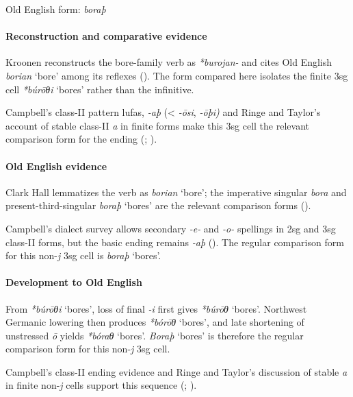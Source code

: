 \documentclass[
  british,
  a4paper,
]{article}
\providecommand{\Recon}[1]{\emph{*#1}}
\begin{document}
Old English form: \emph{boraþ}

\paragraph{Reconstruction and comparative
evidence}\label{reconstruction-and-comparative-evidence-126}

Kroonen reconstructs the bore-family verb as \emph{*burojan-} and cites
Old English {\emph{borian}} `bore' among its reflexes
(). The form compared here
isolates the finite 3sg cell \Recon{búrōθi} `bores' rather than the
infinitive.

Campbell's class-II pattern lufas, \emph{-aþ} (\textless{} \emph{-ōsi},
\emph{-ōþi)} and Ringe and Taylor's account of stable class-II \emph{a}
in finite forms make this 3sg cell the relevant comparison form for the
ending (;
).

\paragraph{Old English evidence}\label{old-english-evidence-128}

Clark Hall lemmatizes the verb as {\emph{borian}} `bore'; the imperative
singular \emph{bora} and present-third-singular {\emph{boraþ}} `bores'
are the relevant comparison forms ().

Campbell's dialect survey allows secondary \emph{-e-} and \emph{-o-}
spellings in 2sg and 3sg class-II forms, but the basic ending remains
\emph{-aþ} (). The
regular comparison form for this non-\emph{j} 3sg cell is {\emph{boraþ}}
`bores'.

\paragraph{Development to Old
English}\label{development-to-old-english-126}

From \Recon{búrōθi} `bores', loss of final \emph{-i} first gives
\Recon{búrōθ} `bores'. Northwest Germanic lowering then produces
\Recon{bórōθ} `bores', and late shortening of unstressed \emph{ō} yields
\Recon{bóraθ} `bores'. {\emph{Boraþ}} `bores' is therefore the regular
comparison form for this non-\emph{j} 3sg cell.

Campbell's class-II ending evidence and Ringe and Taylor's discussion of
stable \emph{a} in finite non-\emph{j} cells support this sequence
(;
).
\end{document}
